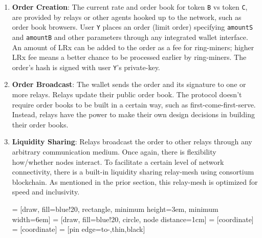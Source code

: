 \documentclass[UTF8,nofonts]{article}
\makeatletter
\newenvironment{figurehere}
 {\def\@captype{figure}}
 {}
\makeatother
\begin{document}
\begin{multicols}{2}
\begin{enumerate}
\item \textbf{Order Creation}: The current rate and order book for token \verb|B| vs token \verb|C|, are provided by relays or other agents hooked up to the network, such as order book browsers. User \verb|Y| places an order (limit order) specifying \verb|amountS| and \verb|amountB| and other parameters through any integrated wallet interface. An amount of LRx can be added to the order as a fee for ring-miners; higher LRx fee means a better chance to be processed earlier by ring-miners. The order's hash is signed with user \verb|Y|'s private-key.

\item \textbf{Order Broadcast}: The wallet sends the order and its signature to one or more relays. Relays update their public order book. The protocol doesn't require order books to be built in a certain way, such as first-come-first-serve. Instead, relays have the power to make their own design decisions in building their order books.

\item \textbf{Liquidity Sharing}: Relays broadcast the order to other relays through any arbitrary communication medium. Once again, there is flexibility how/whether nodes interact. To facilitate a certain level of network connectivity, there is a built-in liquidity sharing relay-mesh using consortium blockchain. As mentioned in the prior section, this relay-mesh is optimized for speed and inclusivity.

\begin{center}
\begin{figurehere}
\centering
{} = [draw, fill=blue!20, rectangle, 
    minimum height=3em, minimum width=6em]
 = [draw, fill=blue!20, circle, node distance=1cm]
 = [coordinate]
 = [coordinate]
 = [pin edge={to-,thin,black}]

\begin{tikzpicture}[
    auto, 
    scale=0.7,
    node distance=2cm,
    >=latex',
    font=\bfseries\footnotesize\sffamily,
    order/.style={
		rectangle,
		scale=0.7,
		rounded corners,
		draw=black, 
		text centered,
		minimum height=12mm,
		minimum width=30mm,
		fill=white
	},
	role/.style={
		circle,
		scale=0.7,
		draw=black, 
		text centered,
		minimum height=12mm,
		minimum width=12mm,
		fill=white
	},
	steps/.style={
		circle,
		scale=0.7,
		draw=black, 
		text centered,
		fill=black,
		text=white
	},
	account/.style={
		circle,
		scale=0.7,
		draw=black, 
		text centered,
		minimum height=16mm,
		minimum width=16mm,
		fill=white
	},
	label/.style={
	  scale=0.7
    }
  ]


\end{tikzpicture}
\end{figurehere}
\end{center}
\end{enumerate}
\end{multicols}
\end{document}
